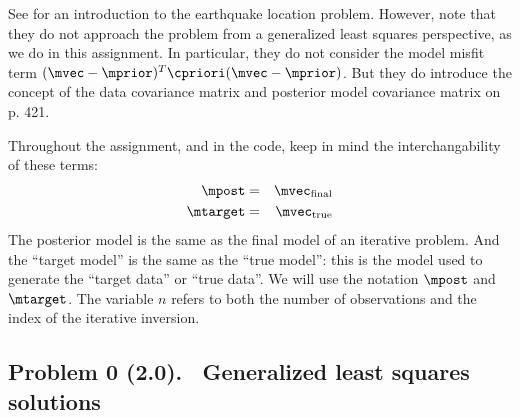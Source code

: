 \documentclass[11pt,titlepage,fleqn]{article}
\begin{document}
See \citet[][Chapter 7]{SteinWysession} for an introduction to the earthquake location problem. However, note that they do not approach the problem from a generalized least squares perspective, as we do in this assignment. In particular, they do not consider the model misfit term $(\mvec-\mprior)^T \cpriori (\mvec-\mprior)$. But they do introduce the concept of the data covariance matrix and posterior model covariance matrix on p. 421.

Throughout the assignment, and in the code, keep in mind the interchangability of these terms:
%
\begin{eqnarray*}
\mpost &=& \mvec_{\rm final}
\\
\mtarget &=& \mvec_{\rm true}
\end{eqnarray*}
%
The posterior model is the same as the final model of an iterative problem. And the ``target model'' is the same as the ``true model'': this is the model used to generate the ``target data'' or ``true data''. We will use the notation $\mpost$ and $\mtarget$. The variable $n$ refers to both the number of observations and the index of the iterative inversion.


\pagebreak
\subsection*{Problem 0 (2.0). \ptag\ Generalized least squares solutions}
\end{document}
